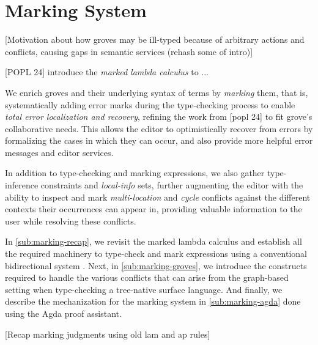 
\section{Marking System}%
\label{sec:Marking System}

[Motivation about how groves may be ill-typed because of arbitrary actions and conflicts, causing gaps in semantic services (rehash some of intro)]

[POPL 24] introduce the \emph{marked lambda calculus} to ...

We enrich groves and their underlying syntax of terms by \emph{marking} them, that is, systematically adding error marks during the type-checking process to enable \emph{total error localization and recovery}, refining the work from [popl 24] to fit grove's collaborative needs. This allows the editor to optimistically recover from errors by formalizing the cases in which they can occur, and also provide more helpful error messages and editor services.

In addition to type-checking and marking expressions, we also gather type-inference constraints and \emph{local-info} sets, further augmenting the editor with the ability to inspect and mark \emph{multi-location} and \emph{cycle} conflicts against the different contexts their occurrences can appear in, providing valuable information to the user while resolving these conflicts.

In \autoref{sub:marking-recap}, we revisit the marked lambda calculus and establish all the required machinery to type-check and mark expressions using a conventional bidirectional system . Next, in \autoref{sub:marking-groves}, we introduce the constructs required to handle the various conflicts that can arise from the graph-based setting when type-checking a tree-native surface language. And finally, we describe the mechanization for the marking system in \autoref{sub:marking-agda} done using the Agda  proof assistant.

[Recap marking judgments using old lam and ap rules]


